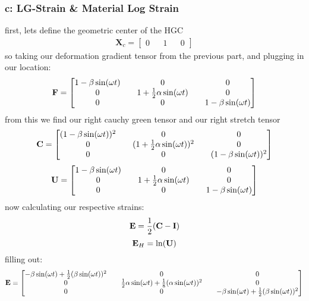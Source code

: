 \subsubsection*{c: LG-Strain \& Material Log Strain}
first, lets define the geometric center of the HGC
\begin{gather}
    \bm{X}_c = 
    \begin{bmatrix}
        0&&1&&0
    \end{bmatrix}
\end{gather}
so taking our deformation gradient tensor from the previous part, and plugging in our location:
\begin{gather}
    \mathbf{F} = 
    \begin{bmatrix}
         1-\beta\sin(\omega t) && 0 && 0\\
        0 && 1 + \frac{1}{2}\alpha\sin(\omega t) && 0 \\
        0 && 0 && 1-\beta\sin(\omega t)
    \end{bmatrix}
\end{gather}
from this we find our right cauchy green tensor and our right stretch tensor
\begin{gather}
    \mathbf{C} = 
    \begin{bmatrix}
        (1-\beta\sin(\omega t))^2 && 0 && 0\\
        0 && (1 + \frac{1}{2}\alpha\sin(\omega t))^2 && 0 \\
        0 && 0 && (1-\beta\sin(\omega t))^2
    \end{bmatrix}
\end{gather}
\begin{gather}
    \mathbf{U} = 
    \begin{bmatrix}
         1-\beta\sin(\omega t) && 0 && 0\\
        0 && 1 + \frac{1}{2}\alpha\sin(\omega t) && 0 \\
        0 && 0 && 1-\beta\sin(\omega t)
    \end{bmatrix}
\end{gather}
now calculating our respective strains:
\begin{equation}
    \mathbf{E} = \frac{1}{2}(\mathbf{C}-\mathbf{I})
\end{equation}
\begin{equation}
    \mathbf{E}_H = \ln(\mathbf{U})
\end{equation}
filling out:
\begin{gather}
    \mathbf{E} = 
    \begin{bmatrix}
        -\beta\sin(\omega t)+\frac{1}{2}(\beta\sin(\omega t))^2 && 0 && 0 \\
        0 && \frac{1}{2}\alpha\sin(\omega t)+\frac{1}{8}(\alpha\sin(\omega t))^2 && 0 \\
          0 && 0 && -\beta\sin(\omega t)+\frac{1}{2}(\beta\sin(\omega t))^2\\
    \end{bmatrix}
\end{gather}
